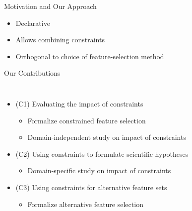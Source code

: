 \documentclass[en, navbarinline, handout]{sdqbeamer}
\begin{document}
\begin{frame}[t]{Motivation and Our Approach}
\begin{itemize}
\begin{itemize}
			\item Declarative
			\item Allows combining constraints
			\item Orthogonal to choice of feature-selection method
		\end{itemize}
	\end{itemize}
\end{frame}

\begin{frame}[t]{Our Contributions}
	\vspace{-\baselineskip} %
	\begin{columns}
		\begin{itemize}
			\item (C1) Evaluating the impact of constraints \cite{bach2022empirical}
			\begin{itemize}
				\item Formalize constrained feature selection
				\item Domain-independent study on impact of constraints
			\end{itemize}
			\item (C2) Using constraints to formulate scientific hypotheses \cite{bach2022empirical}
			\begin{itemize}
				\item Domain-specific study on impact of constraints
			\end{itemize}
			\pause
			\item (C3) Using constraints for alternative feature sets \cite{bach2023finding, bach2024alternative}
			\begin{itemize}
				\item Formalize alternative feature selection

\end{itemize}
\end{itemize}
\end{columns}
\end{frame}
\end{document}

